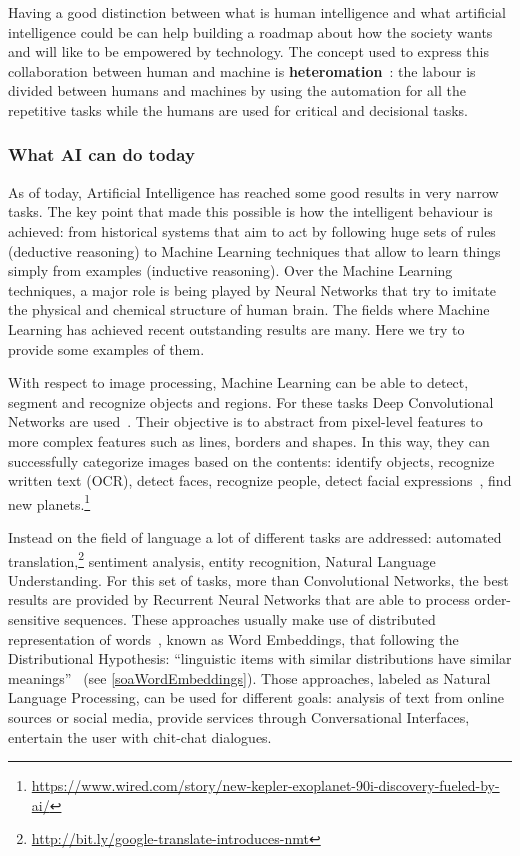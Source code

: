 Having a good distinction between what is human intelligence and what artificial intelligence could be can help building a roadmap about how the society wants and will like to be empowered by technology. The concept used to express this collaboration between human and machine is \textbf{heteromation}~\cite{ekbia2014heteromation}: the labour is divided between humans and machines by using the automation for all the repetitive tasks while the humans are used for critical and decisional tasks.

\subsubsection{What AI can do today}
As of today, Artificial Intelligence has reached some good results in very narrow tasks. The key point that made this possible is how the intelligent behaviour is achieved: from historical systems that aim to act by following huge sets of rules (deductive reasoning) to Machine Learning techniques that allow to learn things simply from examples (inductive reasoning). Over the Machine Learning techniques, a major role is being played by Neural Networks that try to imitate the physical and chemical structure of human brain. The fields where Machine Learning has achieved recent outstanding results are many. Here we try to provide some examples of them.

With respect to image processing, Machine Learning can be able to detect, segment and recognize objects and regions. For these tasks Deep Convolutional Networks are used~\cite{lecun2015deep}. Their objective is to abstract from pixel-level features to more complex features such as lines, borders and shapes. In this way, they can successfully categorize images based on the contents: identify objects, recognize written text (OCR), detect faces, recognize people, detect facial expressions~\cite{tian2005facial}, find new planets.\footnote{\url{https://www.wired.com/story/new-kepler-exoplanet-90i-discovery-fueled-by-ai/}}

Instead on the field of language a lot of different tasks are addressed: automated translation,\footnote{\url{http://bit.ly/google-translate-introduces-nmt}} sentiment analysis, entity recognition, Natural Language Understanding. For this set of tasks, more than Convolutional Networks, the best results are provided by Recurrent Neural Networks that are able to process order-sensitive sequences. These approaches usually make use of distributed representation of words~\cite{bengio2003neural}, known as Word Embeddings, that following the Distributional Hypothesis: ``linguistic items with similar distributions have similar meanings''~\cite{sahlgren2008distributional} (see \ref{soaWordEmbeddings}). Those approaches, labeled as Natural Language Processing, can be used for different goals: analysis of text from online sources or social media, provide services through Conversational Interfaces, entertain the user with chit-chat dialogues.

